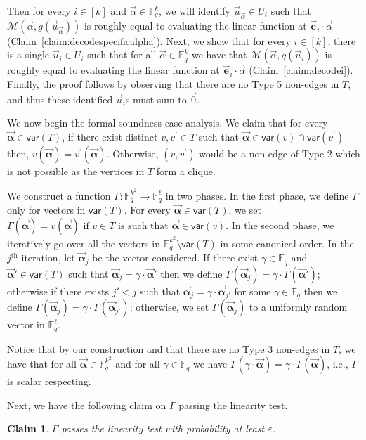 \documentclass[11pt]{article}
\newcommand{\F}{\mathbb{F}}
\newtheorem{claim}[theorem]{Claim}
\newcommand{\alphab}{\vec{\bm{\alpha}}}
\newcommand{\var}{\mathsf{var}}
\newcommand{\M}{\mathcal{M}}
\begin{document}
Then for every $i\in[k]$ and $\vec{\alpha}\in\F_q^k$, we will identify  $\vec{u}_{\vec{\alpha}}\in U_i$ such that $\M(\vec{\alpha},g(\vec{u}_{\vec{\alpha}}))$ is roughly equal to evaluating the linear function at $\vec{\bm e}_i\cdot \vec{\alpha}$ (Claim~\ref{claim:decodespecificalpha}). Next, we show that for every $i\in[k]$, there is a single $\vec{u}_i\in U_i$  such that for all $\vec{\alpha}\in \F_q^k$ we have that  $\M(\vec{\alpha},g(\vec{u}_i))$ is roughly equal to evaluating the linear function at $\vec{\bm e}_i\cdot \vec{\alpha}$ (Claim~\ref{claim:decodei}). Finally, the proof follows by  observing that there are no Type 5 non-edges in $T$, and thus   these identified $\vec{u}_i$s must sum to $\vec{0}$. 


We now begin the formal soundness case analysis. We claim that for every $\alphab\in \var(T)$, if there exist distinct $v,v^{\prime}\in T$ such that $\alphab\in \var(v)\cap\var(v^{\prime})$ then, $v(\alphab)=v^{\prime}(\alphab)$. Otherwise, $(v,v^{\prime})$ would be a non-edge of Type 2 which is not possible as the vertices in $T$ form a clique. 

We construct a function $\Gamma:\F_q^{k^2}\to \F_q^\ell$  in two phases. In the first phase, we define $\Gamma$ only for vectors in $\var(T)$.   For every $\vec{\bm{\alpha}}\in\var(T)$, we set $
\Gamma(\vec{\bm{\alpha}})=
v(\vec{\bm{\alpha}})\text{ if }v\in T\text{ is such that }\vec{\bm{\alpha}}\in \var(v)$.
In the second phase, 
we iteratively go over all the vectors in $\F_q^{k^2}\setminus \var(T)$ in some canonical order. In the $j^{\text{th}}$ iteration, let $\alphab_j$ be the vector considered. If there exist $\gamma\in \F_q$ and $\alphab'\in \var(T)$ such that $\alphab_j=\gamma\cdot \alphab'$ then we define $\Gamma(\alphab_j)=\gamma\cdot \Gamma(\alphab')$; otherwise if there exists $j'<j$ such that $\alphab_j=\gamma\cdot \alphab_{j'}$ for some $\gamma\in\F_q$ then we define $\Gamma(\alphab_j)=\gamma\cdot \Gamma(\alphab_{j'})$; otherwise, we set $\Gamma(\alphab_j)$ to a uniformly random vector in $\F_q^\ell$. 

Notice that by our construction and that there are no Type 3 non-edges in $T$, we have that for all $\alphab\in \F_q^{k^2}$ and for all $\gamma\in \F_q$ we have $\Gamma(\gamma\cdot\alphab)=\gamma\cdot \Gamma(\alphab)$, i.e., $\Gamma$ is scalar respecting. 

Next, we have the following claim on $\Gamma$ passing the linearity test.

\begin{claim}\label{claim:lintest}
$\Gamma$ passes the linearity test with probability at least $\varepsilon$. 
\end{claim}
\end{document}
